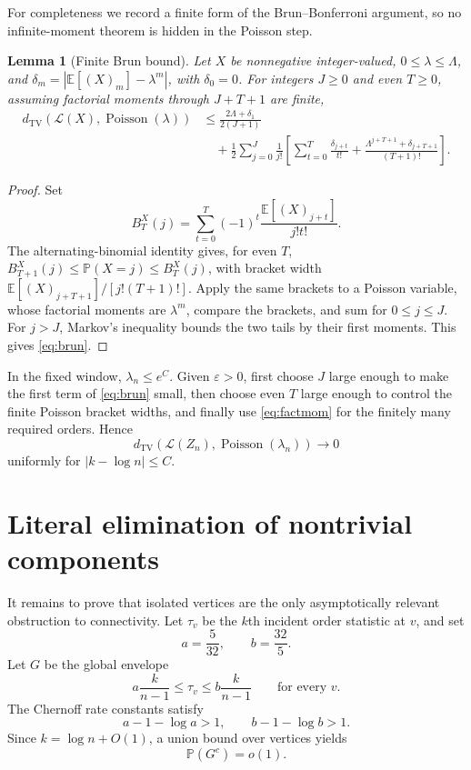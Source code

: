 \documentclass[11pt]{article}
\newtheorem{lemma}[theorem]{Lemma}
\newcommand{\Pp}{\mathbb P}
\newcommand{\Ee}{\mathbb E}
\newcommand{\1}{\mathbf 1}
\newcommand{\TV}{\mathrm{TV}}
\newcommand{\Poi}{\operatorname{Poisson}}
\begin{document}
For completeness we record a finite form of the Brun--Bonferroni argument, so no
infinite-moment theorem is hidden in the Poisson step.

\begin{lemma}[Finite Brun bound]\label{lem:brun}
Let $X$ be nonnegative integer-valued, $0\le\lambda\le\Lambda$, and
$\delta_m=|\Ee[(X)_m]-\lambda^m|$, with $\delta_0=0$.  For integers $J\ge0$ and even
$T\ge0$, assuming factorial moments through $J+T+1$ are finite,
\begin{align}
 d_{\TV}(\mathcal L(X),\Poi(\lambda))
 &\le \frac{2\Lambda+\delta_1}{2(J+1)}\\
 &\quad+\frac12\sum_{j=0}^J\frac1{j!}
 \left[\sum_{t=0}^T\frac{\delta_{j+t}}{t!}
 +\frac{\Lambda^{j+T+1}+\delta_{j+T+1}}{(T+1)!}\right].
 \label{eq:brun}
\end{align}
\end{lemma}

\begin{proof}
Set
\[
 B_T^X(j)=\sum_{t=0}^T(-1)^t\frac{\Ee[(X)_{j+t}]}{j!t!}.
\]
The alternating-binomial identity gives, for even $T$,
$B_{T+1}^X(j)\le\Pp(X=j)\le B_T^X(j)$, with bracket width
$\Ee[(X)_{j+T+1}]/[j!(T+1)!]$.  Apply the same brackets to a Poisson variable, whose
factorial moments are $\lambda^m$, compare the brackets, and sum for $0\le j\le J$.
For $j>J$, Markov's inequality bounds the two tails by their first moments.  This gives
\eqref{eq:brun}.
\end{proof}

In the fixed window, $\lambda_n\le e^C$.  Given $\varepsilon>0$, first choose $J$ large
enough to make the first term of \eqref{eq:brun} small, then choose even $T$ large enough
to control the finite Poisson bracket widths, and finally use \eqref{eq:factmom} for the
finitely many required orders.  Hence
\begin{equation}\label{eq:TV}
 d_{\TV}(\mathcal L(Z_n),\Poi(\lambda_n))\to0
\end{equation}
uniformly for $|k-\log n|\le C$.

\section{Literal elimination of nontrivial components}

It remains to prove that isolated vertices are the only asymptotically relevant obstruction
to connectivity.  Let $\tau_v$ be the $k$th incident order statistic at $v$, and set
\[
 a=\frac5{32},\qquad b=\frac{32}{5}.
\]
Let $G$ be the global envelope
\begin{equation}\label{eq:envelope}
 a\frac{k}{n-1}\le\tau_v\le b\frac{k}{n-1}\qquad\text{for every }v.
\end{equation}
The Chernoff rate constants satisfy
\[
 a-1-\log a>1,\qquad b-1-\log b>1.
\]
Since $k=\log n+O(1)$, a union bound over vertices yields
\begin{equation}\label{eq:Gfail}
 \Pp(G^c)=o(1).
\end{equation}
\end{document}

